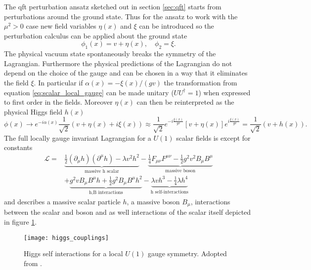 The \ac{qft} perturbation ansatz sketched out in section \ref{sec:qft} starts from perturbations around the ground state. Thus for the ansatz to work with the $\mu^2>0$ case new field variables $\eta(x)$ and $\xi$ can be introduced so the perturbation calculus can be applied about the ground state
\begin{equation}
    \phi_1(x)=v+\eta(x),\quad \phi_2=\xi.
\end{equation}
The physical vacuum state spontaneously breaks the symmetry of the Lagrangian. Furthermore the physical predictions of the Lagrangian do not depend on the choice of the gauge and can be chosen in a way that it eliminates the field $\xi$. In particular if $\alpha(x)=-\xi(x)/(gv)$ the transformation from equation \ref{eq:scalar_local_gauge} can be made unitary ($UU^\dagger=1$) when expressed to first order in the fields. Moreover $\eta(x)$ can then be reinterpreted as the physical Higgs field $h(x)$
\begin{equation}
    \phi(x)  \rightarrow  e^{-i \alpha(x)}\frac{1}{\sqrt{2}}(v+\eta(x)+i\xi(x))
    \approx
    \frac{1}{\sqrt{2}}e^{-i \frac{\xi(x)}{gv}}[v+\eta(x)]e^{i\frac{\xi(x)}{gv}}
    =
    \frac{1}{\sqrt{2}}(v+h(x)).
\end{equation}
The full locally gauge invariant Lagrangian for a $U(1)$ scalar fields is except for constants
\begin{align}
    \mathcal{L}= &
    \underbrace{\frac{1}{2}(\partial_\mu h)(\partial^\mu h)-\lambda v^2 h^2}_{\text{massive h scalar}}
    -
    \underbrace{\frac{1}{4}F_{\mu\nu}F^{\mu\nu} -\frac{1}{2}g^2v^2 B_\mu B^\mu}_{\text{massive boson}}
    \nonumber
    \\
                 & + \underbrace{g^2vB_\mu B^\mu h+\frac{1}{2}g^2 B_\mu B^\mu h^2}_{\text{h,B interactions}}
    -
    \underbrace{\lambda v h^3 -\frac{1}{4}\lambda h^4}_{\text{h self-interactions}}
\end{align}
and describes a massive scalar particle $h$, a massive boson $B_\mu$, interactions between the scalar and boson and as well interactions of the scalar itself depicted in figure \ref{fig:higgs_couplings}.
\begin{figure}
    \centering
    \texttt{[image: higgs\_couplings]}
    \caption[]{Higgs self interactions for a local $U(1)$ gauge symmetry. Adopted from \citep{thomson2013modern}.}
    \label{fig:higgs_couplings}
\end{figure}

